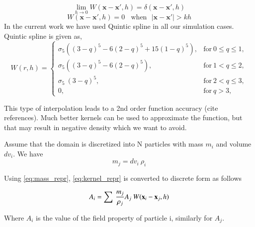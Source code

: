 \begin{equation}
  \label{eq:kernel_delta}
  \lim_{h \to 0} W(\boldsymbol{x} - \boldsymbol{x}', h) = \delta(\boldsymbol{x} - \boldsymbol{x}', h)
\end{equation}
\begin{equation}
  \label{eq:compact_support}
  W(\boldsymbol{x} - \boldsymbol{x}', h) = 0 \>\>\>\>    \text{when}  \>\>\> |\boldsymbol{x} - \boldsymbol{x}'| > kh
\end{equation}
In the current work we have used Quintic spline in all our simulation cases. Quintic spline is given as,
\begin{equation}
  \label{eq:quintic_spline}
  W(r, h) =
  \begin{cases}
    \sigma_5\left( (3-q)^5 - 6(2-q)^5 + 15(1-q)^5 \right), & \textrm{for} \ 0\leq q \leq 1,\\
    \sigma_5\left( (3-q)^5 - 6(2-q)^5 \right), & \textrm{for} \ 1 <  q \leq 2,\\
    \sigma_5 \ (3-q)^5 , & \textrm{for} \ 2 < q \leq 3,\\
    0, & \textrm{for} \ q>3,
  \end{cases}
\end{equation}


This type of interpolation leads to a 2nd order function accuracy (cite
references). Much better kernels can be used to approximate the function, but
that may result in negative density which we want to avoid.

Assume that the domain is discretized into N particles with mass $m_i$ and volume
$dv_i$. We have
\begin{equation}
  \label{eq:mass_repr}
  m_j = dv_i \> \rho_i
\end{equation}

Using \eqref{eq:mass_repr}, \eqref{eq:kernel_repr} is converted to
discrete form as follows

\begin{equation}
  \label{eq:discrete_form}
  A_i = \sum\> \frac{m_j}{\rho_j} A_j\> W(\mathbf{x}_i - \mathbf{x}_j, h)
\end{equation}

Where $A_i$ is the value of the field property of particle i,
similarly for $A_j$.

